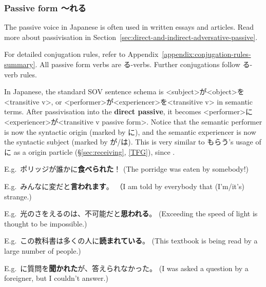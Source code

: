 \documentclass[../nihongo-gakushuu-kyouzai.tex]{subfiles}
\begin{document}
\color{black}
\subsubsection{Passive form  〜れる} \label{sec:causative-form}

The passive voice in Japanese is often used in written essays and articles. Read more about passivisation in Section~\ref{sec:direct-and-indirect-adversative-passive}.

For detailed conjugation rules, refer to Appendix~\ref{appendix:conjugation-rules-summary}. All passive form verbs are る-verbs. Further conjugations follow る-verb rules. 


In Japanese, the standard SOV sentence schema is <subject>が<object>を<transitive v>, or <performer>が<experiencer>を<transitive v> in semantic terms. After passivisation into the \textbf{direct passive}, it becomes <performer>に<experiencer>が<transitive v passive form>. Notice that the semantic performer is now the syntactic origin (marked by に), and the semantic experiencer is now the syntactic subject (marked by が/は). This is very similar to もらう's usage of に as a origin particle (\S\ref{sec:receiving}, \href{https://www.tofugu.com/japanese-grammar/particle-ni/\#in-social-interactions-and-transactions}{[TFG]}), since .

E.g.\ ポリッジが誰かに\textbf{食べられた}！ (The porridge was eaten by somebody!)

E.g.\ みんなに変だと\textbf{言われます}。 （I am told by everybody that (I'm/it's) strange.)

E.g.\ 光のさをえるのは、不可能だと\textbf{思われる}。 (Exceeding the speed of light is thought to be impossible.)

E.g.\ この教科書は多くの人に\textbf{読まれている}。 (This textbook is being read by a large number of people.)

E.g.\ に質問を\textbf{聞かれた}が、答えられなかった。 (I was asked a question by a foreigner, but I couldn't answer.)
\end{document}
